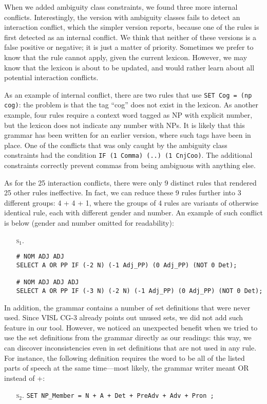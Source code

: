 {{When we added ambiguity class constraints, we found three more internal conflicts.
Interestingly, the version with ambiguity classes fails to detect an interaction conflict, which the simpler version reports, because one of the rules is first detected as an internal conflict. 
We think that neither of these versions is a false positive or negative; it is just a matter of priority. Sometimes we prefer to know that the rule cannot apply, given the current lexicon. 
However, we may know that the lexicon is about to be updated, and would rather learn about all potential interaction conflicts.

As an example of internal conflict, there are two rules that use \texttt{SET Cog = (np cog)}: the problem is that the tag ``cog'' does not exist in the lexicon. As another example, four rules require a context word tagged as NP with explicit number, but the lexicon does not indicate any number with NPs. It is likely that this grammar has been written for an earlier version, where such tags have been in place.
One of the conflicts that was only caught by the ambiguity class constraints had the condition \texttt{IF (1 Comma) (..) (1 CnjCoo)}. The additional constraints correctly prevent commas from being ambiguous with anything else.

As for the 25 interaction conflicts, there were only 9 distinct rules that rendered 25 other rules ineffective.
In fact, we can reduce these 9 rules further into 3 different groups: 4 + 4 + 1, where the groups of 4 rules are variants of otherwise identical rule, each with different gender and number.
An example of such conflict is below (gender and number omitted for readability):

\begin{itemize}
\item[\textsc{s$_{1}$.}] 
\begin{verbatim}
# NOM ADJ ADJ
SELECT A OR PP IF (-2 N) (-1 Adj_PP) (0 Adj_PP) (NOT 0 Det);

# NOM ADJ ADJ ADJ
SELECT A OR PP IF (-3 N) (-2 N) (-1 Adj_PP) (0 Adj_PP) (NOT 0 Det);
\end{verbatim}
\end{itemize}


In addition, the grammar contains a number of set definitions that were never
used. Since VISL CG-3 already points out unused sets, we did not add such
feature in our tool. However, we noticed an unexpected benefit when
we tried to use the set definitions from the grammar directly as our
readings: this way, we can discover inconsistencies even in
set definitions that are not used in any rule.
For instance, the following definition requires the word to be all of
the listed parts of speech at the same time---most likely, the grammar writer meant 
OR instead of +:
\begin{itemize}
\item[\textsc{s$_2$.}] 
\texttt{SET NP\_Member = N + A + Det + PreAdv + Adv + Pron ;}
\end{itemize}

}}
